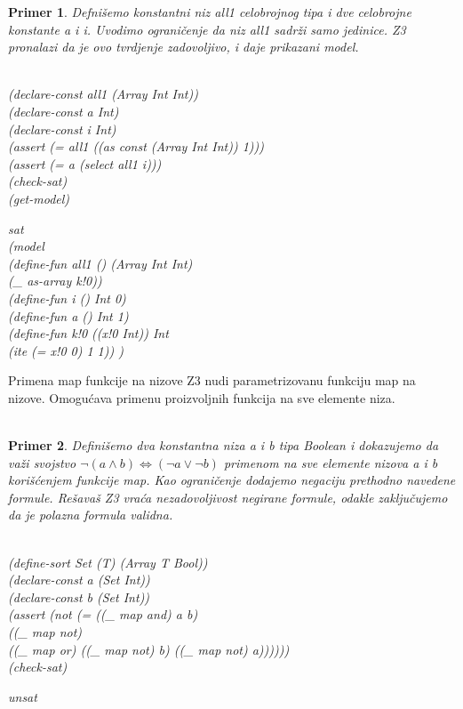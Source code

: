 \documentclass[12pt,oneside]{memoir}
\newtheorem{primer}{Primer}
\begin{document}
\begin{primer} Defnišemo konstantni niz all1 celobrojnog tipa i dve celobrojne konstante a i i. Uvodimo ograničenje da niz all1 sadrži samo jedinice. Z3 pronalazi da je ovo tvrdjenje zadovoljivo, i daje prikazani model.\\ \\
\begin{minipage}[b]{0.5\textwidth}
(declare-const all1 (Array Int Int))
\\(declare-const a Int)
\\(declare-const i Int)
\\(assert (= all1 ((as const (Array Int Int)) 1)))
\\(assert (= a (select all1 i)))
\\(check-sat)
\\(get-model)
\end{minipage}
\hspace{1cm} 
\begin{minipage}[b]{0.5\textwidth}
sat 
\\(model 
\\(define-fun all1 () (Array Int Int) 
\\(\_ as-array k!0)) 
\\(define-fun i () Int 0) 
\\(define-fun a () Int 1) 
\\(define-fun k!0 ((x!0 Int)) Int 
\\(ite (= x!0 0) 1 1)) )
\end{minipage}
\end{primer}

Primena map funkcije na nizove
Z3 nudi parametrizovanu funkciju map na nizove. Omogućava primenu proizvoljnih funkcija na sve elemente niza. \\ \\
\begin{primer} Definišemo dva konstantna niza a i b tipa Boolean i dokazujemo da važi svojstvo $\neg{(a \land b)} \Leftrightarrow (\neg{a} \lor \neg{b}) $ primenom na sve elemente nizova a i b korišćenjem funkcije map. Kao ograničenje dodajemo negaciju prethodno navedene formule. Rešavaš Z3 vraća nezadovoljivost negirane formule, odakle zaključujemo da je polazna formula validna.\\ \\
\begin{minipage}[b]{0.5\textwidth}
(define-sort Set (T) (Array T Bool))
\\(declare-const a (Set Int))
\\(declare-const b (Set Int))
\\(assert (not (= ((\_ map and) a b) 
\\((\_ map not) 
\\((\_ map or) ((\_ map not) b) ((\_ map not) a))))))
\\(check-sat)
\end{minipage}
\hspace{2cm} 
\begin{minipage}[t]{0.5\textwidth}
\vspace{-4.7cm}
unsat 
\end{minipage}
\end{primer}
\end{document}
